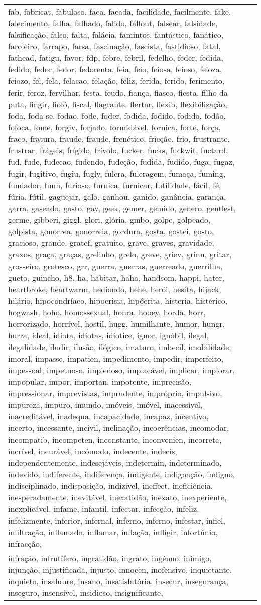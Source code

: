 \begin{longtable}{|*3{p{15cm}|}}
fab, fabricat, fabuloso, faca, facada, facilidade, facilmente, fake, falecimento, falha, falhado, falido, fallout, falsear, falsidade, falsificação, falso, falta, falácia, famintos, fantástico, fanático, faroleiro, farrapo, farsa, fascinação, fascista, fastidioso, fatal, fathead, fatigu, favor, fdp, febre, febril, fedelho, feder, fedida, fedido, fedor, fedor, fedorenta, feia, feio, feiosa, feioso, feioza, feiozo, fel, fela, felacao, felação, feliz, ferida, ferido, ferimento, ferir, feroz, fervilhar, festa, feudo, fiança, fiasco, fiesta, filho da puta, fingir, fiofó, fiscal, flagrante, flertar, flexib, flexibilização, foda, foda-se, fodao, fode, foder, fodida, fodido, fodido, fodão, fofoca, fome, forgiv, forjado, formidável, fornica, forte, força, fraco, fratura, fraude, fraude, frenético, fricção, frio, frustrante, frustrar, frágeis, frígido, frívolo, fucker, fucks, fuckwit, fuctard, fud, fude, fudecao, fudendo, fudeção, fudida, fudido, fuga, fugaz, fugir, fugitivo, fugiu, fugly, fulera, fuleragem, fumaça, fuming, fundador, funn, furioso, furnica, furnicar, futilidade, fácil, fé, fúria, fútil, gaguejar, galo, ganhou, ganido, ganância, garança, garra, gaseado, gasto, gay, geek, gemer, gemido, genero, gentlest, germe, gibberi, giggl, glori, glória, gmbo, golpe, golpeado, golpista, gonorrea, gonorreia, gordura, gosta, gostei, gosto, gracioso, grande, gratef, gratuito, grave, graves, gravidade, graxos, graça, graças, grelinho, grelo, greve, griev, grinn, gritar, grosseiro, grotesco, grr, guerra, guerras, guerreado, guerrilha, gueto, guincho, h8, ha, habitar, haha, handsom, happi, hater, heartbroke, heartwarm, hediondo, hehe, herói, hesita, hijack, hilário, hipocondríaco, hipocrisia, hipócrita, histeria, histérico, hogwash, hoho, homossexual, honra, hooey, horda, horr, horrorizado, horrível, hostil, hugg, humilhante, humor, hungr, hurra, ideal, idiota, idiotas, idiotice, ignor, ignóbil, ilegal, ilegalidade, iludir, ilusão, ilógico, imaturo, imbecil, imobilidade, imoral, impasse, impatien, impedimento, impedir, imperfeito, impessoal, impetuoso, impiedoso, implacável, implicar, implorar, impopular, impor, importan, impotente, imprecisão, impressionar, imprevistas, imprudente, impróprio, impulsivo, impureza, impuro, imundo, imóveis, imóvel, inacessível, inacreditável, inadequa, incapacidade, incapaz, incentivo, incerto, incessante, incivil, inclinação, incoerências, incomodar, incompatib, incompeten, inconstante, inconvenien, incorreta, incrível, incurável, incómodo, indecente, indecis, independentemente, indesejáveis, indetermin, indeterminado, indevido, indiferente, indiferença, indigente, indignação, indigno, indisciplinado, indisposição, indizível, ineffect, ineficiência, inesperadamente, inevitável, inexatidão, inexato, inexperiente, inexplicável, infame, infantil, infectar, infecção, infeliz, infelizmente, inferior, infernal, inferno, inferno, infestar, infiel, infiltração, inflamado, inflamar, inflação, infligir, infortúnio, infracção, \\ infração, infrutífero, ingratidão, ingrato, ingénuo, inimigo, injunção, injustificada, injusto, innocen, inofensivo, inquietante, inquieto, insalubre, insano, insatisfatória, insecur, insegurança, inseguro, insensível, insidioso, insignificante, 
\end{longtable}
